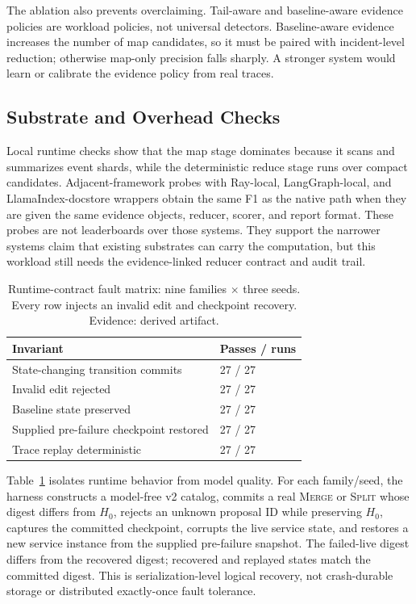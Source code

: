 \documentclass[sigplan,anonymous,nonacm]{acmart}
\begin{document}
The ablation also prevents overclaiming. Tail-aware and baseline-aware evidence policies are workload policies, not universal detectors. Baseline-aware evidence increases the number of map candidates, so it must be paired with incident-level reduction; otherwise map-only precision falls sharply. A stronger system would learn or calibrate the evidence policy from real traces.

\subsection{Substrate and Overhead Checks}

Local runtime checks show that the map stage dominates because it scans and summarizes event shards, while the deterministic reduce stage runs over compact candidates. Adjacent-framework probes with Ray-local, LangGraph-local, and LlamaIndex-docstore wrappers obtain the same F1 as the native path when they are given the same evidence objects, reducer, scorer, and report format. These probes are not leaderboards over those systems. They support the narrower systems claim that existing substrates can carry the computation, but this workload still needs the evidence-linked reducer contract and audit trail.

\begin{table}[t]
\caption{Runtime-contract fault matrix: nine families $\times$ three seeds. Every row injects an invalid edit and checkpoint recovery. Evidence: derived artifact.}
\label{tab:runtime-contract}
\centering
\normalsize
\begin{tabular}{@{}p{}p{}@{}}
\toprule
Invariant & Passes / runs \\
\midrule
State-changing transition commits & 27 / 27 \\
Invalid edit rejected & 27 / 27 \\
Baseline state preserved & 27 / 27 \\
Supplied pre-failure checkpoint restored & 27 / 27 \\
Trace replay deterministic & 27 / 27 \\
\bottomrule
\end{tabular}
\end{table}

Table~\ref{tab:runtime-contract} isolates runtime behavior from model quality. For each family/seed, the harness constructs a model-free v2 catalog, commits a real \textsc{Merge} or \textsc{Split} whose digest differs from $H_0$, rejects an unknown proposal ID while preserving $H_0$, captures the committed checkpoint, corrupts the live service state, and restores a new service instance from the supplied pre-failure snapshot. The failed-live digest differs from the recovered digest; recovered and replayed states match the committed digest. This is serialization-level logical recovery, not crash-durable storage or distributed exactly-once fault tolerance.
\end{document}
